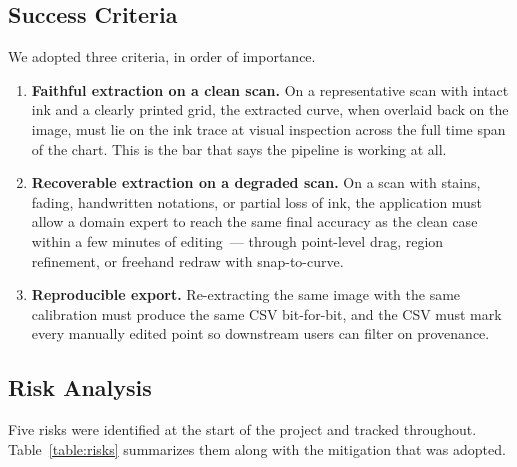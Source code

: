 \documentclass[a4paper,12pt]{report}
\begin{document}
\subsection{Success Criteria}

We adopted three criteria, in order of importance.

\begin{enumerate}
    \item \textbf{Faithful extraction on a clean scan.} On a representative scan with intact ink and a clearly printed grid, the extracted curve, when overlaid back on the image, must lie on the ink trace at visual inspection across the full time span of the chart. This is the bar that says the pipeline is working at all.
    \item \textbf{Recoverable extraction on a degraded scan.} On a scan with stains, fading, handwritten notations, or partial loss of ink, the application must allow a domain expert to reach the same final accuracy as the clean case within a few minutes of editing~--- through point-level drag, region refinement, or freehand redraw with snap-to-curve.
    \item \textbf{Reproducible export.} Re-extracting the same image with the same calibration must produce the same CSV bit-for-bit, and the CSV must mark every manually edited point so downstream users can filter on provenance.
\end{enumerate}

\subsection{Risk Analysis}

Five risks were identified at the start of the project and tracked throughout. Table~\ref{table:risks} summarizes them along with the mitigation that was adopted.
\end{document}
